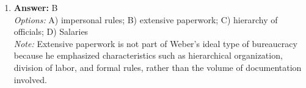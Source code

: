 \documentclass[12pt]{article}
\begin{document}
\begin{enumerate}[label=\arabic*.]
\\ \textit{Note:} Walt Disney, Sony, and Time Warner are considered transnational corporations because they operate and have significant business activities in multiple countries, enabling them to influence global markets and cultures.
\item \textbf{Answer:} B
\\ \textit{Options:} A) impersonal rules; B) extensive paperwork; C) hierarchy of officials; D) Salaries
\\ \textit{Note:} Extensive paperwork is not part of Weber's ideal type of bureaucracy because he emphasized characteristics such as hierarchical organization, division of labor, and formal rules, rather than the volume of documentation involved.
\end{enumerate}
\end{document}
